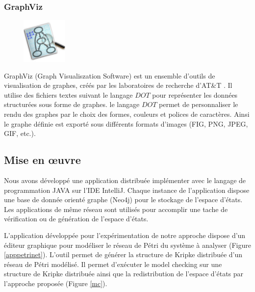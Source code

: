 \subsubsection*{GraphViz}
\begin{figure}
	\vspace{-50pt}
	\begin{center}
		\includegraphics[width=0.2\textwidth]{img/graphviz}
	\end{center}  
\vspace{-20pt}
\vspace{-10pt}  
\end{figure}
GraphViz (Graph Visualiszation Software) est un ensemble d'outils de visualisation de graphes, créés par les laboratoires de recherche d'AT\&T \citep{graphviz}. Il utilise des fichiers textes suivant le langage $DOT$ pour représenter les données structurées sous forme de graphes. le langage $DOT$ permet  de personnaliser le rendu des graphes par le choix des formes, couleurs et polices de caractères. Ainsi le graphe définie est exporté sous différents formats d'images (FIG, PNG, JPEG, GIF, etc.).

\subsection{Mise en œuvre}
Nous avons développé une application distribuée  implémenter avec le langage de programmation JAVA sur l'IDE IntelliJ. Chaque instance de l'application dispose une base de donnée orienté graphe (Neo4j) pour le stockage de l'espace d'états. Les applications de même réseau sont utilisés pour accomplir une tache de vérification ou de génération de l'espace d'états.

L'application développée pour l'expérimentation de notre approche dispose d’un éditeur graphique pour modéliser le réseau de Pétri du système à analyser (Figure \ref{apppetrinet}). L'outil permet de générer la structure de Kripke distribuée d'un réseau de Pétri modélisé. Il permet  d'exécuter  le model checking sur une structure de Kripke distribuée ainsi que la redistribution de l'espace d'états par l'approche proposée (Figure \ref{mc}).

